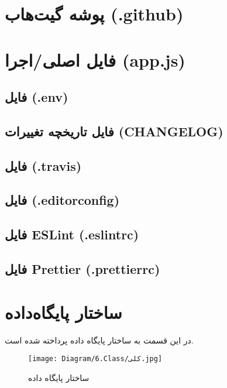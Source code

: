 \section{پوشه گیت‌هاب (.github)}


\section{فایل اصلی/اجرا (app.js)}


\subsection{فایل  (.env)}


\subsection{فایل تاریخچه تغییرات (CHANGELOG)}


\subsection{فایل  (.travis)}


\subsection{فایل  (.editorconfig)}


\subsection{فایل ESLint (.eslintrc)}


\subsection{فایل Prettier (.prettierrc)}





\section{ساختار پایگاه‌داده}
در این قسمت به ساختار پایگاه داده پرداخته شده است.
\begin{figure}[H]
	\texttt{[image: Diagram/6.Class/کلی.jpg]}
	\centering
	\caption{ساختار پایگاه داده}
	\label{fig:db:پایگاه}
\end{figure}

